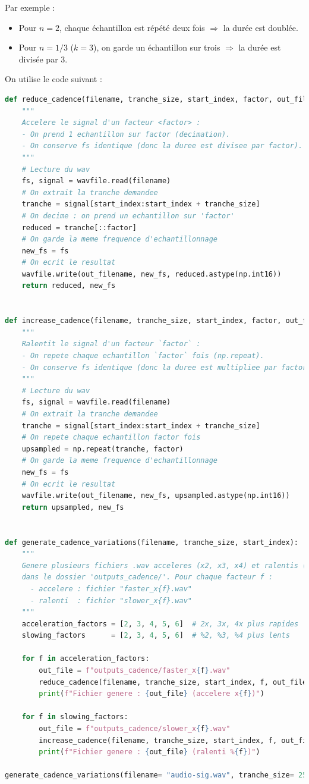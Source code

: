 Par exemple :
\begin{itemize}
    \item Pour $n = 2$, chaque échantillon est répété deux fois $\Rightarrow$ la durée est doublée.
    \item Pour $n = 1/3$ ($k = 3$), on garde un échantillon sur trois $\Rightarrow$ la durée est divisée par 3.
\end{itemize}

On utilise le code suivant :

\begin{lstlisting}[language=python]
    def reduce_cadence(filename, tranche_size, start_index, factor, out_filename):
    """
    Accelere le signal d'un facteur <factor> :
    - On prend 1 echantillon sur factor (decimation).
    - On conserve fs identique (donc la duree est divisee par factor).
    """
    # Lecture du wav
    fs, signal = wavfile.read(filename)
    # On extrait la tranche demandee
    tranche = signal[start_index:start_index + tranche_size]
    # On decime : on prend un echantillon sur 'factor'
    reduced = tranche[::factor]
    # On garde la meme frequence d'echantillonnage
    new_fs = fs
    # On ecrit le resultat
    wavfile.write(out_filename, new_fs, reduced.astype(np.int16))
    return reduced, new_fs


def increase_cadence(filename, tranche_size, start_index, factor, out_filename):
    """
    Ralentit le signal d'un facteur `factor` :
    - On repete chaque echantillon `factor` fois (np.repeat).
    - On conserve fs identique (donc la duree est multipliee par factor).
    """
    # Lecture du wav
    fs, signal = wavfile.read(filename)
    # On extrait la tranche demandee
    tranche = signal[start_index:start_index + tranche_size]
    # On repete chaque echantillon factor fois
    upsampled = np.repeat(tranche, factor)
    # On garde la meme frequence d'echantillonnage
    new_fs = fs
    # On ecrit le resultat
    wavfile.write(out_filename, new_fs, upsampled.astype(np.int16))
    return upsampled, new_fs


def generate_cadence_variations(filename, tranche_size, start_index):
    """
    Genere plusieurs fichiers .wav acceleres (x2, x3, x4) et ralentis (%2, %3, %4)
    dans le dossier 'outputs_cadence/'. Pour chaque facteur f :
      - accelere : fichier "faster_x{f}.wav"
      - ralenti  : fichier "slower_x{f}.wav"
    """
    acceleration_factors = [2, 3, 4, 5, 6]  # 2x, 3x, 4x plus rapides
    slowing_factors      = [2, 3, 4, 5, 6]  # %2, %3, %4 plus lents

    for f in acceleration_factors:
        out_file = f"outputs_cadence/faster_x{f}.wav"
        reduce_cadence(filename, tranche_size, start_index, f, out_file)
        print(f"Fichier genere : {out_file} (accelere x{f})")

    for f in slowing_factors:
        out_file = f"outputs_cadence/slower_x{f}.wav"
        increase_cadence(filename, tranche_size, start_index, f, out_file)
        print(f"Fichier genere : {out_file} (ralenti %{f})")

generate_cadence_variations(filename= "audio-sig.wav", tranche_size= 25600, start_index = 500)
\end{lstlisting}

